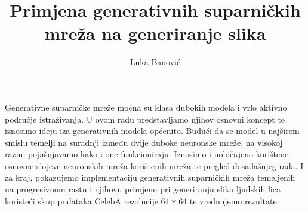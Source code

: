 \documentclass[times, utf8, diplomski, numeric]{fer}
\newcommand\todo[1]{\textcolor{red}{#1}}
\begin{document}
\thesisnumber{\todo{thesis number}}

\title{Primjena generativnih suparničkih mreža na generiranje slika}

\author{Luka Banović}

\maketitle

\izvornik

\zahvala{}

\tableofcontents

















\begin{sazetak}
Generativne suparničke mreže moćna su klasa dubokih modela i vrlo aktivno područje istraživanja. U ovom radu predstavljamo njihov osnovni koncept te iznosimo ideju iza generativnih modela općenito. Budući da se model u najširem smislu temelji na suradnji između dvije duboke neuronske mreže, na visokoj razini pojašnjavamo kako i one funkcioniraju. Iznosimo i uobičajeno korištene osnovne slojeve neuronskih mreža korištenih mreža te pregled dosadašnjeg rada. I za kraj, pokazujemo implementaciju generativnih suparničkih mreža temeljenih na progresivnom rastu i njihovu primjenu pri generiranju slika ljudskih lica koristeći skup podataka CelebA rezolucije $64 \times 64$ te vrednujemo rezultate.

\end{sazetak}
\end{document}
